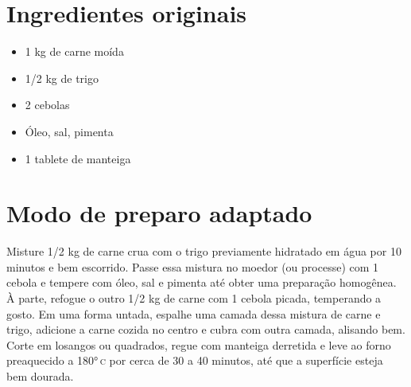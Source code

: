 \section{Ingredientes originais}

\begin{itemize}
\item 1 kg de carne moída
\item 1/2 kg de trigo
\item 2 cebolas
\item Óleo, sal, pimenta
\item 1 tablete de manteiga
\end{itemize}

\section{Modo de preparo adaptado}

Misture 1/2 kg de carne crua com o trigo previamente hidratado em água por 10 minutos e bem escorrido. Passe essa mistura no moedor (ou processe) com 1 cebola e tempere com óleo, sal e pimenta até obter uma preparação homogênea. À parte, refogue o outro 1/2 kg de carne com 1 cebola picada, temperando a gosto. Em uma forma untada, espalhe uma camada dessa mistura de carne e trigo, adicione a carne cozida no centro e cubra com outra camada, alisando bem. Corte em losangos ou quadrados, regue com manteiga derretida e leve ao forno preaquecido a 180°\,\textsc{c} por cerca de 30 a 40 minutos, até que a superfície esteja bem dourada.